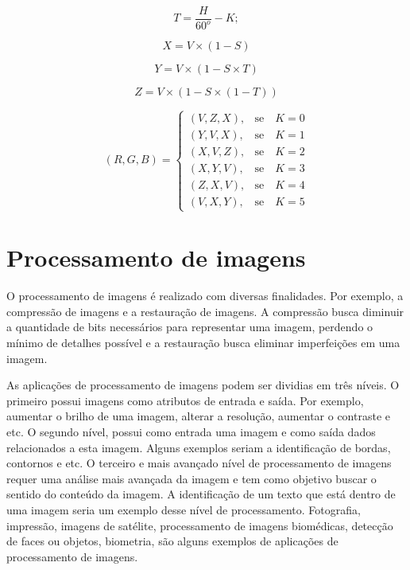 \documentclass[	12pt, Times, openright, twoside, a4paper, english, brazil]{abntex2}
\begin{document}
\begin{equation}
\label{eq:hsv2rgbT}
    T = \frac{H}{60^o} - K;
\end{equation}

\begin{equation}
\label{eq:hsv2rgbX}
    X = V \times (1 - S)
\end{equation}

\begin{equation}
\label{eq:hsv2rgbY}
    Y = V \times (1 - S \times T)
\end{equation}

\begin{equation}
\label{eq:hsv2rgbZ}
    Z = V \times (1 - S \times (1 - T))
\end{equation}

\begin{equation}
\label{eq:hsv2rgbRGB}
(R,G,B)=\left\{
\begin{array}{rc}

    (V,Z,X),&\mbox{se}\quad K = 0 \\
    (Y,V,X),&\mbox{se}\quad K = 1 \\
    (X,V,Z),&\mbox{se}\quad K = 2 \\
    (X,Y,V),&\mbox{se}\quad K = 3 \\
    (Z,X,V),&\mbox{se}\quad K = 4 \\
    (V,X,Y),&\mbox{se}\quad K = 5
    

\end{array}\right.
\end{equation}











\section{Processamento de imagens}

O processamento de imagens é realizado com diversas finalidades. Por exemplo, a compressão de imagens e a restauração de imagens. A compressão busca diminuir a quantidade de bits necessários para representar uma imagem, perdendo o mínimo de detalhes possível e a restauração busca eliminar imperfeições em uma imagem. 

As aplicações de processamento de imagens podem ser dividias em três níveis. O primeiro possui imagens como atributos de entrada e saída. Por exemplo, aumentar o brilho de uma imagem, alterar a resolução, aumentar o contraste e etc. O segundo nível, possui como entrada uma imagem e como saída dados relacionados a esta imagem. Alguns exemplos seriam a identificação de bordas, contornos e etc. O terceiro e mais avançado nível de processamento de imagens requer uma análise mais avançada da imagem e tem como objetivo buscar o sentido do conteúdo da imagem. A identificação de um texto que está dentro de uma imagem seria um exemplo desse nível de processamento. Fotografia, impressão, imagens de satélite, processamento de imagens biomédicas, detecção de faces ou objetos, biometria, são alguns exemplos de aplicações de processamento de imagens.
\end{document}
